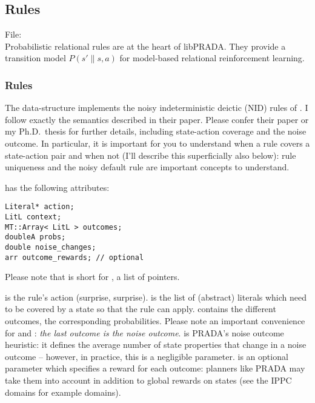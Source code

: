 \documentclass[10pt,twoside,twocolumn,fleqn]{article}
\begin{document}


\subsection{Rules}
\label{sec:rules}

File: \\

Probabilistic relational rules are at the heart of libPRADA. They provide
a transition model $P(s' \| s,a)$ for model-based relational reinforcement
learning.


\subsubsection{Rules}

The data-structure  implements the noisy indeterministic deictic
(NID) rules of \cite{pasula07ai}. I follow exactly the semantics described
in their paper. Please confer their paper or my Ph.D.~thesis
\citep{11-lang-phd} for further details, including state-action coverage
and the noise outcome. In particular, it is important for you to understand
when a rule covers a state-action pair and when not (I'll describe this
superficially also below): rule uniqueness and the noisy default rule are
important concepts to understand.

 has the following attributes:
\begin{lstlisting}
Literal* action;
LitL context;
MT::Array< LitL > outcomes;
doubleA probs;
double noise_changes;
arr outcome_rewards; // optional
\end{lstlisting}
Please note that  is short for , a
list of  pointers.

 is the rule's action (surprise, surprise).  is
the list of (abstract) literals which need to be covered by a state so that
the rule can apply.  contains the different outcomes,
 the corresponding probabilities. Please note an important
convenience for  and : \emph{the last outcome is
the noise outcome}.  is PRADA's noise outcome
heuristic: it defines the average number of state properties that change
in a noise outcome -- however, in practice, this is a negligible parameter.
 is an optional parameter which specifies a reward
for each outcome: planners like PRADA may take them into account in
addition to global rewards on states (see the IPPC domains for example
domains).
\end{document}
